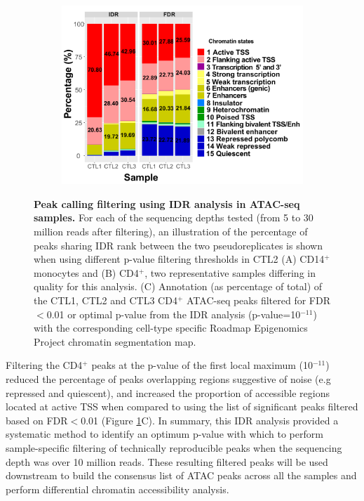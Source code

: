 \begin{figure}[htbp]
\begin{subfigure}{0.65\textwidth}
\includegraphics[width=\textwidth]{./Results1/pdfs/stacked_barplot_chromatin_states_percent_CD4_qval_vs_PVAL_IDR_filtered}
\caption{\textbf{}} %
\end{subfigure}%
\caption[Peak calling filtering using IDR analysis in ATAC-seq samples.]{\textbf{Peak calling filtering using IDR analysis in ATAC-seq samples.} For each of the sequencing depths tested (from 5 to 30 million reads after filtering), an illustration of the percentage of peaks sharing IDR rank between the two pseudoreplicates is shown when using different p-value filtering thresholds in CTL2 (A) CD14$^+$ monocytes and (B) CD4$^+$, two representative samples differing in quality for this analysis. (C) Annotation (as percentage of total) of the CTL1, CTL2 and CTL3 CD4$^+$ ATAC-seq peaks filtered for FDR$<$0.01 or optimal p-value from the IDR analysis (p-value=10$^{-11}$) with the corresponding cell-type specific Roadmap Epigenomics Project chromatin segmentation map.}
\label{figure:Peak_calling_IDR_filtering_and_chrom_stated_ATAC}
\end{figure} 


Filtering the CD4$^+$ peaks at the p-value of the first local maximum (10$^{-11}$) reduced the percentage of peaks overlapping regions suggestive of noise (e.g repressed and quiescent), and increased the proportion of accessible regions located at active TSS when compared to using the list of significant peaks filtered based on FDR$<$0.01 (Figure \ref{figure:Peak_calling_IDR_filtering_and_chrom_stated_ATAC}C). In summary, this IDR analysis provided a systematic method to identify an optimum p-value with which to perform sample-specific filtering of technically reproducible peaks when the sequencing depth was over 10 million reads. These resulting filtered peaks will be used downstream to build the consensus list of ATAC peaks across all the samples and perform differential chromatin accessibility analysis. 

